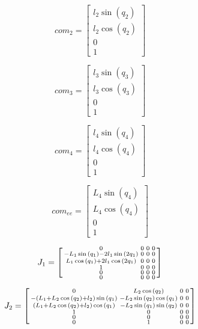\documentclass{article}
\begin{document}
\begin{equation}
	com_2 = \begin{bmatrix}
 	l_{2} \sin{\left(q_{2} \right)}\\l_{2} \cos{\left(q_{2} \right)}\\0\\1
\end{bmatrix}
\end{equation}

\begin{equation}
	com_3 = \begin{bmatrix}
 	l_{3} \sin{\left(q_{3} \right)}\\l_{3} \cos{\left(q_{3} \right)}\\0\\1
\end{bmatrix}
\end{equation}

\begin{equation}
	com_4 = \begin{bmatrix}
 	l_{4} \sin{\left(q_{4} \right)}\\l_{4} \cos{\left(q_{4} \right)}\\0\\1
\end{bmatrix}
\end{equation}

\begin{equation}
	com_{ee} = \begin{bmatrix}
 	L_{4} \sin{\left(q_{4} \right)}\\L_{4} \cos{\left(q_{4} \right)}\\0\\1
\end{bmatrix}
\end{equation}



\begin{equation}
	J_1 = \begin{bsmallmatrix}
	0 & 0 & 0 & 0\\
	- L_{1} \sin{(q_{1} )} - 2 l_{1} \sin{(2 q_{1} )} & 0 & 0 & 0\\
	L_{1} \cos{(q_{1} )} + 2 l_{1} \cos{(2 q_{1} )} & 0 & 0 & 0\\
	1 & 0 & 0 & 0\\
	0 & 0 & 0 & 0\\
	0 & 0 & 0 & 0
\end{bsmallmatrix}
\end{equation}

\begin{equation}
	J_2 = \begin{bsmallmatrix}0 & L_{2} \cos{(q_{2} )} & 0 & 0\\
	- (L_{1} + L_{2} \cos{(q_{2} )} + l_{2}) \sin{(q_{1} )} & - L_{2} \sin{(q_{2} )} \cos{(q_{1} )} & 0 & 0\\
	(L_{1} + L_{2} \cos{(q_{2} )} + l_{2}) \cos{(q_{1} )} & - L_{2} \sin{(q_{1} )} \sin{(q_{2} )} & 0 & 0\\
	1 & 0 & 0 & 0\\
	0 & 0 & 0 & 0\\
	0 & 1 & 0 & 0
\end{bsmallmatrix}
\end{equation}
\end{document}
